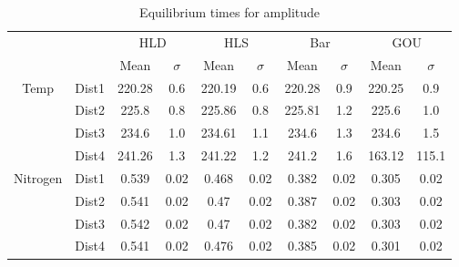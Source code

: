 \begin{table}[h]
\centering
\caption{Equilibrium times for amplitude}
\label{table:5}
\begin{tabular}{cccccccccc}
\toprule
{} & {} & \multicolumn{2}{c}{HLD} & \multicolumn{2}{c}{HLS} & \multicolumn{2}{c}{Bar} & \multicolumn{2}{c}{GOU} \\
{} & {} & {Mean} & {$\sigma$} & {Mean} & {$\sigma$} & {Mean} & {$\sigma$} & {Mean} & {$\sigma$} \\
\midrule
\multirow[c]{4}{*}{Temp} & Dist1 & 220.28 & 0.6 & 220.19 & 0.6 & 220.28 & 0.9 & 220.25 & 0.9 \\
 & Dist2 & 225.8 & 0.8 & 225.86 & 0.8 & 225.81 & 1.2 & 225.6 & 1.0 \\
 & Dist3 & 234.6 & 1.0 & 234.61 & 1.1 & 234.6 & 1.3 & 234.6 & 1.5 \\
 & Dist4 & 241.26 & 1.3 & 241.22 & 1.2 & 241.2 & 1.6 & 163.12 & 115.1 \\
\multirow[c]{4}{*}{Nitrogen} & Dist1 & 0.539 & 0.02 & 0.468 & 0.02 & 0.382 & 0.02 & 0.305 & 0.02 \\
 & Dist2 & 0.541 & 0.02 & 0.47 & 0.02 & 0.387 & 0.02 & 0.303 & 0.02 \\
 & Dist3 & 0.542 & 0.02 & 0.47 & 0.02 & 0.382 & 0.02 & 0.303 & 0.02 \\
 & Dist4 & 0.541 & 0.02 & 0.476 & 0.02 & 0.385 & 0.02 & 0.301 & 0.02 \\
\bottomrule
\end{tabular}
\end{table}
